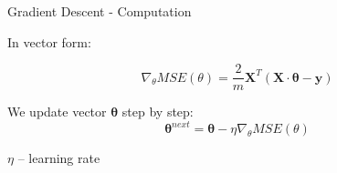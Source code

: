 \documentclass{beamer}
\begin{document}

\begin{frame}
{\centerline{Gradient Descent -  Computation  }}
In vector form:

$$\nabla_{\theta} MSE(\theta) = \frac{2}{m} \boldsymbol X^T (\boldsymbol X \cdot \boldsymbol \theta - \boldsymbol y)$$

We update vector $\boldsymbol \theta$ step by step:
$$\boldsymbol \theta^{next} = \boldsymbol \theta - \eta \nabla_{\theta} MSE(\theta) $$

$\eta$ -- learning rate
\end{frame}
\end{document}
